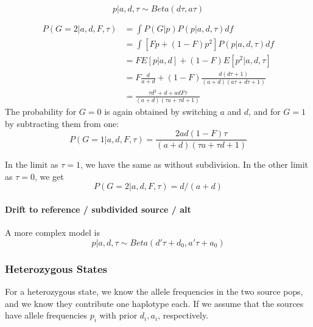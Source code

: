 \documentclass[10pt,a4paper]{article}
\begin{document}
\begin{equation}
p| a, d, \tau \sim Beta (d\tau, a\tau)
\end{equation}



\begin{align}
P(G=2 | a,d, F, \tau) &= \int P(G|p) P(p | a, d, \tau) df\nonumber\\
&= \int \left[ F p + (1-F) p^2\right] P(p | a, d, \tau) df\nonumber\\
&= F E[p|a,d] + (1-F)  E[p^2|a, d, \tau]\nonumber\\
&= F \frac{d}{a+d} + (1-F)  \frac{d (d\tau+1)}{(a+d)(a\tau+d\tau+1)}\nonumber\\
&= \frac{\tau d^2 + d + adF\tau}{(a+d)(\tau a+\tau d+1)}
\end{align}
The probability for $G=0$ is again obtained by switching $a$ and $d$, and for $G=1$ by subtracting them from one:
\begin{equation}
P(G=1 | a,d, F, \tau) = \frac{2ad(1-F)\tau}{(a+d)(\tau a+\tau d+1)}
\end{equation} 

In the limit as $\tau=1$, we have the same as without subdivision. In the 
other limit as $\tau=0$, we get
\begin{equation}
P(G=2|a, d, F, \tau) = d / (a+d)
\end{equation}

\paragraph{Drift to reference / subdivided source / alt}
A more complex model is
\begin{equation}
p| a, d, \tau \sim Beta (d'\tau + d_0, a'\tau + a_0)
\end{equation}




\subsubsection{Heterozygous States}
For a heterozygous state, we know the allele frequencies in the two source pops, and we know they contribute one haplotype each. If we assume that the sources have allele frequencies $p_i$ with prior $d_i, a_i$, respectively.
\end{document}
